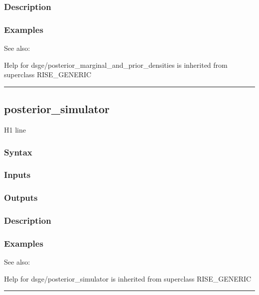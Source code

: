 \documentclass[letterpaper,10pt,english]{sphinxmanual}
\begin{document}
\subsubsection{Description}
\label{classes/models/@dsge/dsge:id112}

\subsubsection{Examples}
\label{classes/models/@dsge/dsge:id113}
See also:

Help for dsge/posterior\_marginal\_and\_prior\_densities is inherited from superclass RISE\_GENERIC


\bigskip\hrule{}\bigskip



\subsection{posterior\_simulator}
\label{classes/models/@dsge/dsge:posterior-simulator}\label{classes/models/@dsge/dsge:id114}
H1 line


\subsubsection{Syntax}
\label{classes/models/@dsge/dsge:id115}

\subsubsection{Inputs}
\label{classes/models/@dsge/dsge:id116}

\subsubsection{Outputs}
\label{classes/models/@dsge/dsge:id117}

\subsubsection{Description}
\label{classes/models/@dsge/dsge:id118}

\subsubsection{Examples}
\label{classes/models/@dsge/dsge:id119}
See also:

Help for dsge/posterior\_simulator is inherited from superclass RISE\_GENERIC


\bigskip\hrule{}\bigskip
\end{document}
